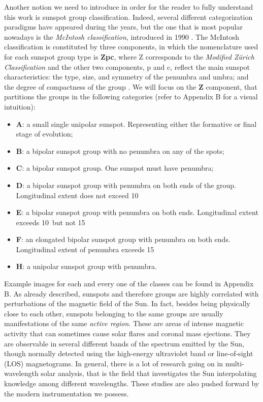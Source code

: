 \bigbreak
\noindent Another notion we need to introduce in order for the reader to fully understand this work is sunspot group classification. Indeed, several different categorization paradigms have appeared during the years, but the one that is most popular nowadays is the \textit{McIntosh classification}, introduced in 1990 \cite{mcintosh1990classification}. The McIntosh classification is constituted by three components, in which the nomenclature used for each sunspot group type is \textbf{Zpc}, where Z corresponds to the \textit{Modified Z\"{u}rich Classification} and the other two components, p and c, reflect the main sunspot characteristics: the type, size, and symmetry of the penumbra and umbra; and the degree of compactness of the group \cite{carrasco2015equivalence}. We will focus on the \textbf{Z} component, that partitions the groups in the following categories\cite{silso-class} (refer to Appendix B for a visual intuition):
\begin{itemize}
  \item \textbf{A}: a small single unipolar sunspot. Representing either the formative or final stage of evolution;
  \item \textbf{B}: a bipolar sunspot group with no penumbra on any of the spots;
  \item \textbf{C}: a bipolar sunspot group. One sunspot must have penumbra;
  \item \textbf{D}: a bipolar sunspot group with penumbra on both ends of the group. Longitudinal extent does not exceed 10\textdegree\;
  \item \textbf{E}: a bipolar sunspot group with penumbra on both ends. Longitudinal extent exceeds 10\textdegree\  but not 15\textdegree\;
  \item \textbf{F}: an elongated bipolar sunspot group with penumbra on both ends. Longitudinal extent of penumbra exceeds 15\textdegree\;
  \item \textbf{H}: a unipolar sunspot group with penumbra.
\end{itemize}
Example images for each and every one of the classes can be found in Appendix B.
\bigbreak
\noindent As already described, sunspots and therefore groups are highly correlated with perturbations of the magnetic field of the Sun. In fact, besides being physically close to each other, sunspots belonging to the same groups are usually manifestations of the same \textit{active region}. These are areas of intense magnetic activity that can sometimes cause solar flares and coronal mass ejections. They are observable in several different bands of the spectrum emitted by the Sun, though normally detected using the high-energy ultraviolet band or line-of-sight (LOS) magnetograms. In general, there is a lot of research going on in multi-wavelength solar analysis, that is the field that investigates the Sun interpolating knowledge among different wavelengths. These studies are also pushed forward by the modern instrumentation we possess.
